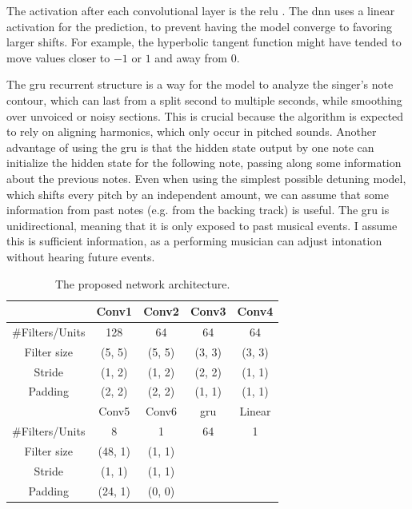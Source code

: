 The activation after each convolutional layer is the \gls{relu} \cite{he2015delving}. The \gls{dnn} uses a linear activation for the prediction, to prevent having the model converge to favoring larger shifts. For example, the hyperbolic tangent function might have tended to move values closer to $-1$ or $1$ and away from 0.

The \gls{gru} recurrent structure is a way for the model to analyze the singer's note contour, which can last from a split second to multiple seconds, while smoothing over unvoiced or noisy sections. This is crucial because the algorithm is expected to rely on aligning harmonics, which only occur in pitched sounds. Another advantage of using the \gls{gru} is that the hidden state output by one note can initialize the hidden state for the following note, passing along some information about the previous notes. Even when using the simplest possible detuning model, which shifts every pitch by an independent amount, we can assume that some information from past notes (e.g. from the backing track) is useful. The \gls{gru} is unidirectional, meaning that it is only exposed to past musical events. I assume this is sufficient information, as a performing musician can adjust intonation without hearing future events. 

\begin{table}[t]
  \begin{center}
    \caption{The proposed network architecture.}
    \begin{tabular}{|c||c|c|c|c|}
    \hline
      & Conv1 & Conv2 & Conv3 & Conv4 \\
      \hline
      \#Filters/Units & 128 & 64 & 64 & 64 \\
      Filter size & (5, 5) & (5, 5) & (3, 3) & (3, 3) \\
      Stride & (1, 2) & (1, 2) & (2, 2) & (1, 1) \\
      Padding & (2, 2) & (2, 2) & (1, 1) & (1, 1) \\
      \hline
      & Conv5 & Conv6 & \gls{gru} & Linear \\
      \hline
      \#Filters/Units & 8 & 1 & 64 & 1 \\
      Filter size & (48, 1) & (1, 1) & & \\
      Stride & (1, 1) & (1, 1) & & \\
      Padding & (24, 1) & (0, 0) & & \\
      \hline
    \end{tabular}
    \vspace{-.1in}
    \label{tab:network}
  \end{center}
\end{table}

